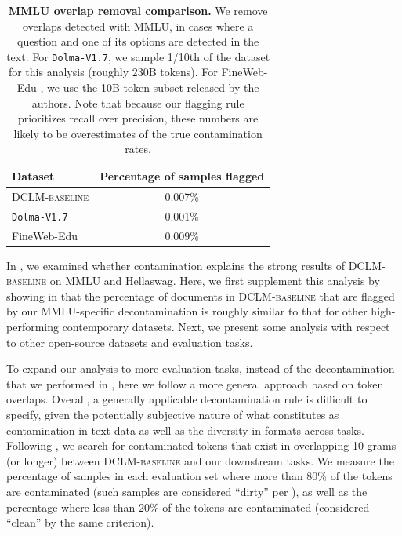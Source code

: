 \documentclass{article}
\newcommand{\hqpool}{\textsc{DCLM-baseline}\xspace}
\newcommand{\dolmalatest}{\texttt{Dolma-V1.7}\xspace}
\begin{document}
\begin{table}[h]
\centering
\caption{\textbf{MMLU overlap removal comparison.} We remove overlaps detected with MMLU, in cases where a question and one of its options are detected in the text. For \dolmalatest \cite{soldaini2024dolma}, we sample 1/10th of the dataset for this analysis (roughly 230B tokens). For FineWeb-Edu \cite{lozhkov2024fineweb-edu}, we use the 10B token subset released by the authors. Note that because our flagging rule prioritizes recall over precision, these numbers are likely to be overestimates of the true contamination rates.}
\label{tab:decontamination-appx-excision-stats}
\begin{tabular}{@{}lc@{}}
\toprule
Dataset                     & Percentage of samples flagged \\ \midrule
\hqpool      & 0.007\%                       \\
\dolmalatest & 0.001\%                       \\
FineWeb-Edu     & 0.009\%                       \\ \bottomrule
\end{tabular}
\end{table}

In , we examined whether contamination explains the strong results of \hqpool on MMLU and Hellaswag. Here, we first supplement this analysis by showing in  that the percentage of documents in \hqpool that are flagged by our MMLU-specific decontamination is roughly similar to that for other high-performing contemporary datasets. Next, we present some analysis with respect to other open-source datasets and evaluation tasks.

To expand our analysis to more evaluation tasks, instead of the decontamination that we performed in , here we follow a more general approach based on token overlaps. Overall, a generally applicable decontamination rule is difficult to specify, given the potentially subjective nature of what constitutes as contamination in text data as well as the diversity in formats across tasks. Following \citet{llama2}, we search for contaminated tokens that exist in overlapping 10-grams (or longer) between \hqpool and our downstream tasks. We measure the percentage of samples in each evaluation set where more than 80\% of the tokens are contaminated (such samples are considered ``dirty'' per \citet{llama2}), as well as the percentage where less than 20\% of the tokens are contaminated (considered ``clean'' by the same criterion).
\end{document}
